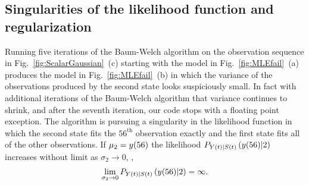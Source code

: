 \subsection{Singularities of the likelihood function and regularization}
\label{sec:regularization}

Running five iterations of the Baum-Welch algorithm on the observation
sequence in Fig.~\ref{fig:ScalarGaussian}~(c) starting with the model
in Fig.~\ref{fig:MLEfail}~(a) produces the model in
Fig.~\ref{fig:MLEfail}~(b) in which the variance of the observations
produced by the second state looks suspiciously small.  In fact with
additional iterations of the Baum-Welch algorithm that variance
continues to shrink, and after the seventh iteration, our code stops
with a floating point exception.  The algorithm is pursuing a
singularity in the likelihood function in which the second state fits
the $56^{\text{th}}$ observation exactly and the first state fits all
of the other observations.  If $\mu_2 = {y}{(56)}$ the likelihood
$P_{{Y}{(t)}|{S}{(t)}} \left({y}{(56)}|2 \right)$ increases without
limit as $\sigma_2 \rightarrow 0$, \ie,
\begin{equation*}
  \lim_{\sigma_2 \rightarrow 0} P_{{Y}{(t)}|{S}{(t)}}
  \left({y}{(56)}|2 \right) = \infty.
\end{equation*}

